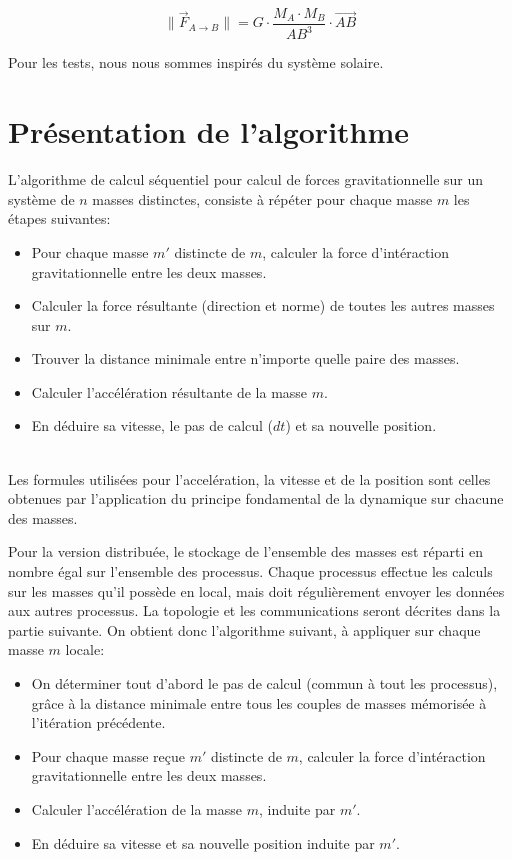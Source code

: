 \documentclass[a4paper,11pt]{article}
\begin{document}
\[
\| \vec{F}_{A\rightarrow B} \| = G \cdot \frac{M_A \cdot M_B}{\mathit{AB^3}} \cdot \mathit{\vec{AB}}
\]

Pour les tests, nous nous sommes inspirés du système solaire.

\section{Présentation de l'algorithme}
L'algorithme de calcul séquentiel pour calcul de forces gravitationnelle sur un système de $n$ masses distinctes, consiste à répéter pour chaque masse $m$ les étapes suivantes:\\

\begin{itemize}
\item Pour chaque masse $m'$ distincte de $m$, calculer la force d'intéraction gravitationnelle entre les deux masses.
\item Calculer la force résultante (direction et norme) de toutes les autres masses sur $m$.
\item Trouver la distance minimale entre n'importe quelle paire des masses.
\item Calculer l'accélération résultante de la masse $m$.
\item En déduire sa vitesse, le pas de calcul ($dt$) et sa nouvelle position.
\end{itemize}
\\
Les formules utilisées pour l'accelération, la vitesse et de la position sont celles obtenues par l'application du principe fondamental de la dynamique sur chacune des masses.

Pour la version distribuée,%
le stockage de l'ensemble des masses est réparti en nombre égal sur l'ensemble des processus. Chaque processus effectue les calculs sur les masses qu'il possède en local, mais doit régulièrement envoyer les données aux autres processus. La topologie et les communications seront décrites dans la partie suivante. On obtient donc l'algorithme suivant, à appliquer sur chaque masse $m$ locale:\\
\begin{itemize}
\item On déterminer tout d'abord le pas de calcul (commun à tout les processus), grâce à la distance minimale entre tous les couples de masses mémorisée à l'itération précédente.
\item Pour chaque masse  reçue $m'$ distincte de $m$, calculer la force d'intéraction gravitationnelle entre les deux masses.
\item Calculer l'accélération de la masse $m$, induite par $m'$.
\item En déduire sa vitesse et sa nouvelle position induite par $m'$.
\end{itemize}
\end{document}
